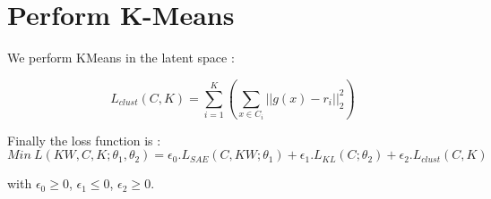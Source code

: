 \documentclass{article}
\begin{document}
\section{Perform K-Means}

We perform KMeans in the latent space :

\begin{equation}\label{eq:clus}
L_{clust}(C, K) = \sum_{i=1}^K (\sum_{x \in C_i} || g(x) - r_i||^2_2 )
\end{equation}

Finally the loss function is :
\begin{equation}\label{eq:loss_FINALE}
  Min~L(KW, C, K; \theta_1, \theta_2) = \epsilon_0.L_{SAE}(C, KW; \theta_1) 
  + \epsilon_1.L_{KL}(C; \theta_2) + \epsilon_2.L_{clust}(C,K)
\end{equation}

with $\epsilon_0 \geq 0$, $\epsilon_1 \leq 0$, $\epsilon_2 \geq 0$.
\nocite{*}
\printbibliography[title=References]
\end{document}
